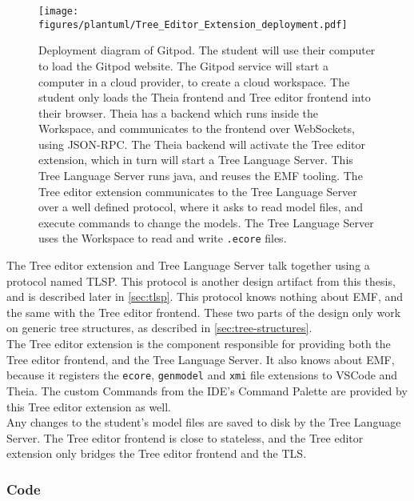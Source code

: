 \begin{figure}[H]  %
  \centering
  \texttt{[image: figures/plantuml/Tree\_Editor\_Extension\_deployment.pdf]}
  \caption[Gitpod deployment diagram]{Deployment diagram of Gitpod. The student will use their computer to load the Gitpod website.
  The Gitpod service will start a computer in a cloud provider, to create a cloud workspace.
  The student only loads the Theia frontend and Tree editor frontend into their browser.
  Theia has a backend which runs inside the Workspace, and communicates to the frontend over WebSockets, using JSON-RPC\@.
  The Theia backend will activate the Tree editor extension, which in turn will start a Tree Language Server.
  This Tree Language Server runs java, and reuses the \acrshort{EMF} tooling.
  The Tree editor extension communicates to the Tree Language Server over a well defined protocol, where it asks to read model files, and execute commands to change the models.
  The Tree Language Server uses the Workspace to read and write \texttt{.ecore} files.}\label{fig:gitpod-deployment-diagram}
\end{figure}

The Tree editor extension and Tree Language Server talk together using a protocol named \acrfull{TLSP}.
This protocol is another design artifact from this thesis, and is described later in \cref{sec:tlsp}.
This protocol knows nothing about \acrshort{EMF}, and the same with the Tree editor frontend.
These two parts of the design only work on generic tree structures, as described in \cref{sec:tree-structures}.\\

The Tree editor extension is the component responsible for providing both the Tree editor frontend, and the Tree Language Server.
It also knows about \acrshort{EMF}, because it registers the \texttt{ecore}, \texttt{genmodel} and \texttt{xmi} file extensions to \gls{VSCode} and \gls{Theia}.
The custom Commands from the \acrshort{IDE}'s Command Palette are provided by this Tree editor extension as well.\\

Any changes to the student's model files are saved to disk by the Tree Language Server.
The Tree editor frontend is close to stateless, and the Tree editor extension only bridges the Tree editor frontend and the TLS.

\subsubsection{Code}

